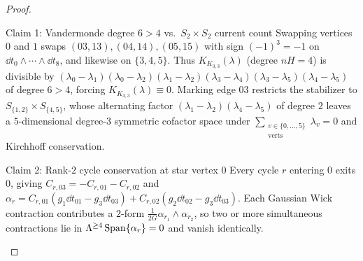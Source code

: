 \begin{proof}\leavevmode
\begin{proofpart}{Claim 1: Vandermonde degree $6 > 4$ vs.\ $S_2\times S_2$ current count}
Swapping vertices $0$ and $1$ swaps $(03,13), (04,14), (05,15)$ with sign $(-1)^3 = -1$ on $\dd t_0\wedge\cdots\wedge\dd t_8$, and likewise on $\{3,4,5\}$. Thus $K_{K_{3,3}}(\lambda)$ (degree $nH = 4$) is divisible by $(\lambda_0-\lambda_1)(\lambda_0-\lambda_2)(\lambda_1-\lambda_2)(\lambda_3-\lambda_4)(\lambda_3-\lambda_5)(\lambda_4-\lambda_5)$ of degree $6 > 4$, forcing $K_{K_{3,3}}(\lambda) \equiv 0$. Marking edge $03$ restricts the stabilizer to $S_{\{1,2\}}\times S_{\{4,5\}}$, whose alternating factor $(\lambda_1-\lambda_2)(\lambda_4-\lambda_5)$ of degree $2$ leaves a $5$-dimensional degree-$3$ symmetric cofactor space under $\sum_{\substack{v\in\{0,\dots,5\}\\\mathrm{verts}}}\lambda_v = 0$ and Kirchhoff conservation.
\end{proofpart}
\begin{proofpart}{Claim 2: Rank-$2$ cycle conservation at star vertex $0$}
Every cycle $r$ entering $0$ exits $0$, giving $C_{r,03} = -C_{r,01} - C_{r,02}$ and $\alpha_r = C_{r,01}(g_1\dd t_{01} - g_3\dd t_{03}) + C_{r,02}(g_2\dd t_{02} - g_3\dd t_{03})$. Each Gaussian Wick contraction contributes a $2$-form $\frac{1}{2G}\alpha_{r_1}\wedge\alpha_{r_2}$, so two or more simultaneous contractions lie in $\Lambda^{\ge 4}\operatorname{Span}\{\alpha_r\} = 0$ and vanish identically.
\end{proofpart}
\end{proof}

